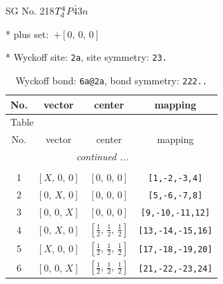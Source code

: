\documentclass[fleqn,8pt]{jsarticle}
\begin{document}
\setcounter{MaxMatrixCols}{32}

\renewcommand{\tablename}{Table~}
\renewcommand{\figurename}{Figure~}
\begin{center}
\LARGE
SG No. 218\quad$T_{\rm d}^{4}$\quad$P\bar{4}3n$\quad[ cubic ]
\end{center}

* plus set:\,\,\,$+\left[ 0,\, 0,\, 0 \right]$


* Wyckoff site: {\tt 2a}, site symmetry: {\tt 23.}
\renewcommand{\arraystretch}{1.2}
\begin{longtable}{cccc}
\caption{Wyckoff bond: {\tt 6a@2a}, bond symmetry: {\tt 222..}}
 \\
 \hline \hline
No. & vector & center & mapping \\ \hline \endfirsthead

\multicolumn{3}{l}{\tablename\ \thetable{}} \\
 \hline \hline
No. & vector & center & mapping \\ \hline \endhead

 \hline \hline
\multicolumn{3}{r}{\footnotesize\it continued ...} \\ \endfoot

 \hline \hline
\multicolumn{3}{r}{} \\ \endlastfoot

1 & $\left[ X,\, 0,\, 0 \right]$ & $\left[ 0,\, 0,\, 0 \right]$ & {\tt [1,-2,-3,4]} \\ \hline
2 & $\left[ 0,\, X,\, 0 \right]$ & $\left[ 0,\, 0,\, 0 \right]$ & {\tt [5,-6,-7,8]} \\ \hline
3 & $\left[ 0,\, 0,\, X \right]$ & $\left[ 0,\, 0,\, 0 \right]$ & {\tt [9,-10,-11,12]} \\ \hline
4 & $\left[ 0,\, X,\, 0 \right]$ & $\left[ \frac{1}{2},\, \frac{1}{2},\, \frac{1}{2} \right]$ & {\tt [13,-14,-15,16]} \\ \hline
5 & $\left[ X,\, 0,\, 0 \right]$ & $\left[ \frac{1}{2},\, \frac{1}{2},\, \frac{1}{2} \right]$ & {\tt [17,-18,-19,20]} \\ \hline
6 & $\left[ 0,\, 0,\, X \right]$ & $\left[ \frac{1}{2},\, \frac{1}{2},\, \frac{1}{2} \right]$ & {\tt [21,-22,-23,24]} \\
\end{longtable}
\renewcommand{\arraystretch}{1.2}
\end{document}
